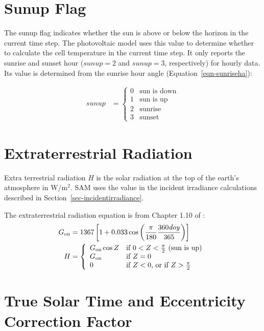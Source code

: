 \documentclass[12pt,letterpaper]{article}
\begin{document}
\section{Sunup Flag}\label{sec-sunup}

The sunup flag indicates whether the sun is above or below the horizon in the current time step. The photovoltaic model uses this value to determine whether to calculate the cell temperature in the current time step. It only reports the sunrise and sunset hour ($\mathit{sunup}=2$ and $\mathit{sunup}=3$, respectively) for hourly data. Its value is determined from the sunrise hour angle (Equation~\ref{eqn-sunriseha}):

\begin{align}\label{eqn-sunrise}
sunup &= \left\{
\begin{array}{ll}
0 & \text{sun is down}\\
1 & \text{sun is up}\\
2 & \text{sunrise}\\
3 & \text{sunset}
\end{array}
\right.
\end{align}

\section{Extraterrestrial Radiation}\label{sec-hextra}

Extra terrestrial radiation $H$ is the solar radiation at the top of the earth's atmosphere in $\mathrm{W/m^2}$. SAM uses the value in the incident irradiance calculations described in Section~\ref{sec-incidentirradiance}.
 
The extraterrestrial radiation equation is from Chapter 1.10 of \citet{duffie2013}:
\begin{align}\label{eqn-hextra}
G_{\mathrm{on}} &= 1367 \left[1+0.033\cos\left( \frac{\pi}{180}\frac{360\mathit{doy}}{365} \right)\right]\notag\\
H &= \left\{
\begin{array}{ll}
G_{\mathrm{on}} \cos Z & \text{if $0 < Z < \frac{\pi}{2}$ (sun is up)}\\
G_{\mathrm{on}} & \text{if $Z=0$}\\
0 & \text{if $Z<0$, or if $Z>\frac{\pi}{2}$}
\end{array}
\right.
\end{align}

\section{True Solar Time and Eccentricity Correction Factor}
\end{document}
